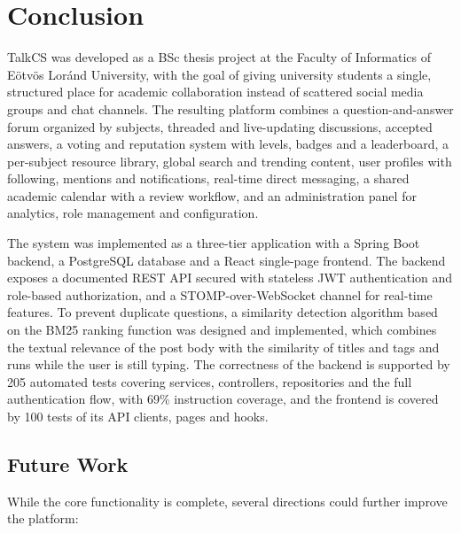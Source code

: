 \chapter{Conclusion}
\label{ch:conclusion}

TalkCS was developed as a BSc thesis project at the Faculty of Informatics of Eötvös
Loránd University, with the goal of giving university students a single, structured
place for academic collaboration instead of scattered social media groups and chat
channels. The resulting platform combines a question-and-answer forum organized by
subjects, threaded and live-updating discussions, accepted answers, a voting and
reputation system with levels, badges and a leaderboard, a per-subject resource library,
global search and trending content, user profiles with following, mentions and
notifications, real-time direct messaging, a shared academic calendar with a review
workflow, and an administration panel for analytics, role management and configuration.

The system was implemented as a three-tier application with a Spring Boot backend, a
PostgreSQL database and a React single-page frontend. The backend exposes a documented
REST API secured with stateless JWT authentication and role-based authorization, and a
STOMP-over-WebSocket channel for real-time features. To prevent duplicate questions, a
similarity detection algorithm based on the BM25 ranking function was designed and
implemented, which combines the textual relevance of the post body with the similarity
of titles and tags and runs while the user is still typing. The correctness of the
backend is supported by 205 automated tests covering services, controllers, repositories
and the full authentication flow, with 69\% instruction coverage, and the frontend is
covered by 100 tests of its API clients, pages and hooks.

\section*{Future Work}

While the core functionality is complete, several directions could further improve the
platform:

